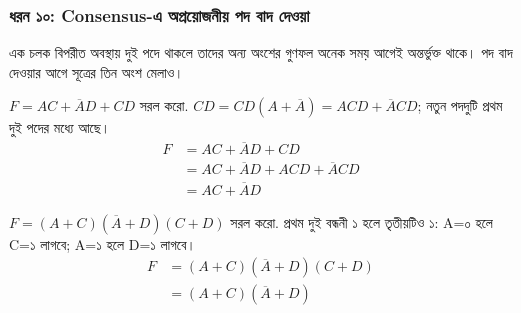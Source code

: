 \subsubsection*{ধরন ১০: Consensus-এ অপ্রয়োজনীয় পদ বাদ দেওয়া}
এক চলক বিপরীত অবস্থায় দুই পদে থাকলে তাদের অন্য অংশের গুণফল অনেক সময় আগেই অন্তর্ভুক্ত থাকে। পদ বাদ দেওয়ার আগে সূত্রের তিন অংশ মেলাও।
\par\smallskip\noindent\begin{minipage}{\linewidth}
$F=AC+\overline A D+CD$ সরল করো.
\chThreeAnswer $CD=CD(A+\overline A)=ACD+\overline ACD$; নতুন পদদুটি প্রথম দুই পদের মধ্যে আছে।
\[\begin{aligned}F&=AC+\overline A D+CD\\
&=AC+\overline A D+ACD+\overline ACD\\
&=AC+\overline A D\end{aligned}\]

\end{minipage}\par\smallskip
\par\smallskip\noindent\begin{minipage}{\linewidth}
$F=(A+C)(\overline A+D)(C+D)$ সরল করো.
\chThreeAnswer প্রথম দুই বন্ধনী ১ হলে তৃতীয়টিও ১: A=০ হলে C=১ লাগবে; A=১ হলে D=১ লাগবে।
\[\begin{aligned}F&=(A+C)(\overline A+D)(C+D)\\
&=(A+C)(\overline A+D)\end{aligned}\]

\end{minipage}\par\smallskip
{}

